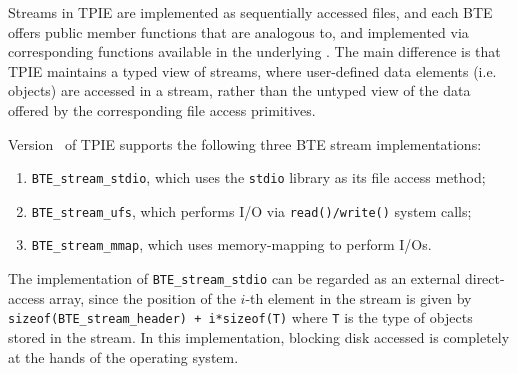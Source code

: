 
Streams in TPIE are implemented as sequentially accessed files, and
each BTE offers public member functions that are analogous to, and
implemented via corresponding functions available in the underlying
. The main difference is that TPIE maintains
a typed view of streams, where user-defined data elements (i.e.
objects) are accessed in a stream, rather than the untyped view of the
data offered by the corresponding file access primitives.


Version \version~of TPIE supports the following three BTE stream
implementations:
\begin{enumerate}
\item \lstinline|BTE_stream_stdio|, which uses the
  \lstinline|stdio| library as its file access method;
    
\item \lstinline|BTE_stream_ufs|, which performs I/O via 
  \lstinline|read()/write()| system calls;
    
\item \lstinline|BTE_stream_mmap|, which uses memory-mapping to
  perform I/Os.
\end{enumerate}

The implementation of \lstinline|BTE_stream_stdio| can be regarded as
an external direct-access array, since the position of the $i$-th
element in the stream is given by 
\lstinline|sizeof(BTE_stream_header) + i*sizeof(T)| 
where \lstinline|T| is the type of objects stored in
the stream. In this implementation, blocking disk accessed is
completely at the hands of the operating system. 

